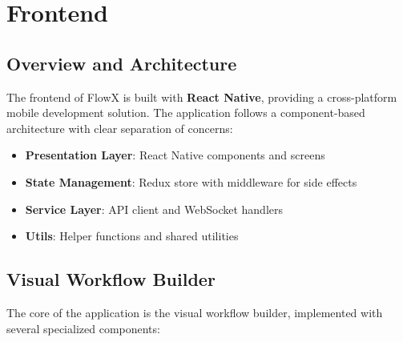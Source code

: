 \section{Frontend}

\subsection{Overview and Architecture}
The frontend of FlowX is built with \textbf{React Native}, providing a cross-platform mobile development solution. The application follows a component-based architecture with clear separation of concerns:
\begin{itemize}
    \item \textbf{Presentation Layer}: React Native components and screens
    \item \textbf{State Management}: Redux store with middleware for side effects
    \item \textbf{Service Layer}: API client and WebSocket handlers
    \item \textbf{Utils}: Helper functions and shared utilities
\end{itemize}

\subsection{Visual Workflow Builder}
The core of the application is the visual workflow builder, implemented with several specialized components:

